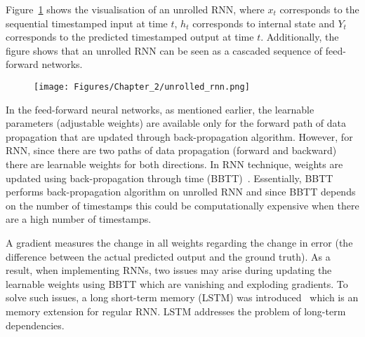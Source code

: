 Figure~\ref{unrolled_rnn} shows the visualisation of an unrolled RNN, where \(x_{t}\) corresponds to the sequential timestamped input at time \(t\), \(h_{t}\) corresponds to internal state  and \(Y_{t}\) corresponds to the predicted timestamped output at time \(t\).
Additionally, the figure shows that an unrolled RNN can be seen as a cascaded sequence of feed-forward networks.
\begin{figure}
	\begin{center}
	\texttt{[image: Figures/Chapter\_2/unrolled\_rnn.png]}
	\end{center}
	\label{unrolled_rnn}
\end{figure}
In the feed-forward neural networks, as mentioned earlier, the learnable parameters (adjustable weights) are available only for the forward path of data propagation that are updated through back-propagation algorithm.
However, for RNN, since there are two paths of data propagation (forward and backward) there are learnable weights for both directions.
In RNN technique, weights are updated using back-propagation through time (BBTT)~\cite{Werbos1990}.
Essentially, BBTT performs back-propagation algorithm on unrolled RNN and since BBTT depends on the number of timestamps this could be computationally expensive when there are a high number of timestamps.

A gradient measures the change in all weights regarding the change in error (the difference between the actual predicted output and the ground truth).
As a result, when implementing RNNs, two issues may arise during updating the learnable weights using BBTT which are vanishing and exploding gradients.
To solve such issues, a long short-term memory (LSTM) was introduced~\cite{Hochreiter1997} which is an memory extension for regular RNN.
LSTM addresses the problem of long-term dependencies.

